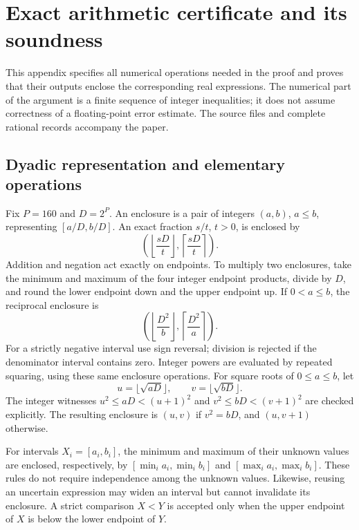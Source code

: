 \section{Exact arithmetic certificate and its soundness}\label{app:arithmetic}

This appendix specifies all numerical operations needed in the proof and
proves that their outputs enclose the corresponding real expressions.
The numerical part of the argument is a finite sequence of integer
inequalities; it does not assume correctness of a floating-point error
estimate. The source files and complete rational records accompany the paper.

\subsection{Dyadic representation and elementary operations}
Fix $P=160$ and $D=2^P$. An enclosure is a pair of integers $(a,b)$,
$a\le b$, representing $[a/D,b/D]$.
An exact fraction $s/t$, $t>0$, is enclosed by
\[
 \left(\left\lfloor\frac{sD}{t}\right\rfloor,
       \left\lceil\frac{sD}{t}\right\rceil\right).
\]
Addition and negation act exactly on endpoints. To multiply two enclosures,
take the minimum and maximum of the four integer endpoint products, divide
by $D$, and round the lower endpoint down and the upper endpoint up.
If $0<a\le b$, the reciprocal enclosure is
\[
 \left(\left\lfloor\frac{D^2}{b}\right\rfloor,
       \left\lceil\frac{D^2}{a}\right\rceil\right).
\]
For a strictly negative interval use sign reversal; division is rejected if
the denominator interval contains zero. Integer powers are evaluated by
repeated squaring, using these same enclosure operations.
For square roots of $0\le a\le b$, let
\[
 u=\lfloor\sqrt{aD}\rfloor,\qquad v=\lfloor\sqrt{bD}\rfloor.
\]
The integer witnesses $u^2\le aD<(u+1)^2$ and
$v^2\le bD<(v+1)^2$ are checked explicitly. The resulting enclosure is
$(u,v)$ if $v^2=bD$, and $(u,v+1)$ otherwise.

For intervals $X_i=[a_i,b_i]$, the minimum and maximum of their unknown
values are enclosed, respectively, by
$[\min_i a_i,\min_i b_i]$ and $[\max_i a_i,\max_i b_i]$.
These rules do not require independence among the unknown values.
Likewise, reusing an uncertain expression may widen an interval but cannot
invalidate its enclosure. A strict comparison $X<Y$ is accepted only when
the upper endpoint of $X$ is below the lower endpoint of $Y$.

